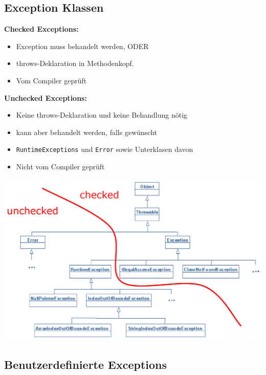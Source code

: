 	\subsection*{Exception Klassen}
		\begin{minipage}[b]{9.3cm}
			\textbf{Checked Exceptions:}\vspace{-0.2cm}
			\begin{itemize}[noitemsep]
				\item Exception muss behandelt werden, ODER
				\item throws-Deklaration in Methodenkopf.
				\item Vom Compiler geprüft
			\end{itemize}
			\textbf{Unchecked Exceptions:}\vspace*{-0.2cm}
			\begin{itemize}[noitemsep]
				\item Keine throws-Deklaration und keine Behandlung nötig
				\item kann aber behandelt werden, falls gewünscht
				\item \texttt{RuntimeExceptions} und \texttt{Error} sowie Unterklasen davon
				\item Nicht vom Compiler geprüft
			\end{itemize}
			\vspace{1.5cm}
		\end{minipage}
		\begin{minipage}[b]{9.5cm}
			\includegraphics[width=\columnwidth]{pics/Exception_hierarchy.png}
		\end{minipage}
	\vspace{-1cm}
	\subsection*{Benutzerdefinierte Exceptions}
		
